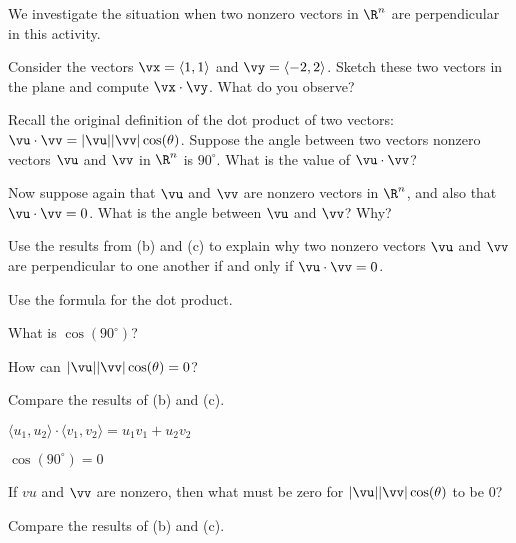 \begin{activity} \label{A:9.3.5}  We investigate the situation when two nonzero vectors in $\R^n$ are perpendicular in this activity.%
    \ba
    \item Consider the vectors $\vx = \langle 1,1 \rangle$ and $\vy = \langle -2, 2 \rangle$.  Sketch these two vectors in the plane and compute $\vx \cdot \vy$.  What do you observe?
    
    \item  Recall the original definition of the dot product of two vectors: $\vu \cdot \vv = |\vu| |\vv| \cos(\theta)$.   Suppose the angle between two vectors nonzero vectors $\vu$ and $\vv$ in $\R^n$ is $90^{\circ}$. What is the value of $\vu \cdot \vv$?

    \item Now suppose again that $\vu$ and $\vv$ are nonzero vectors in $\R^n$, and also that $\vu \cdot \vv = 0$. What is the angle between $\vu$ and $\vv$? Why?

    \item Use the results from (b) and (c) to explain why two nonzero vectors $\vu$ and $\vv$ are perpendicular to one another if and only if $\vu \cdot \vv = 0$.

    \ea
\end{activity}
\begin{smallhint}
\ba
\item Use the formula for the dot product. 
\item What is $\cos(90^{\circ})$? 
\item How can $|\vu| |\vv| \cos(\theta) = 0$?
\item Compare the results of (b) and (c). 
\ea
\end{smallhint}
\begin{bighint}
\ba
\item $\langle u_1, u_2 \rangle \cdot \langle v_1, v_2 \rangle = u_1v_1 + u_2v_2$
\item $\cos(90^{\circ}) = 0$ 
\item If $vu$ and $\vv$ are nonzero, then what must be zero for $|\vu| |\vv| \cos(\theta)$ to be 0? 
\item Compare the results of (b) and (c). 
\ea
\end{bighint}

